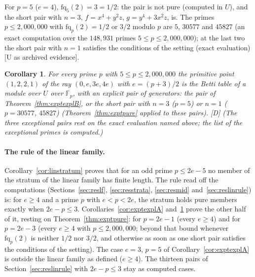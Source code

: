 \documentclass[11pt]{article}
\newtheorem{corollary}{Corollary}
\theoremstyle{definition}
\theoremstyle{remark}
\newcommand{\F}{\mathbb{F}}
\begin{document}
For $p=5$ ($e=4$), $\mathrm{fq}_5(2)=3=1/2$: the pair is not pure (computed in $U$), and the short pair with $n=3$, $f=x^4+y^2z$, $g=y^4+3x^2z$, is. The primes $p\le2{,}000{,}000$ with $\mathrm{fq}_p(2)=1/2$ or $3/2$ modulo $p$ are $5$, $30577$ and $45827$ (an exact computation over the $148{,}931$ primes $5\le p\le2{,}000{,}000$); at the last two the short pair with $n=1$ satisfies the conditions of the setting (exact evaluation) [U as archived evidence].

\begin{corollary}\label{cor:exptexplB}
For every prime $p$ with $5\le p\le2{,}000{,}000$ the primitive point $(1,2,2,1)$ of the ray $(0,e,3e,4e)$ with $e=(p+3)/2$ is the Betti table of a module over $U$ over $\F_p$, with an explicit pair of generators: the pair of Theorem~\ref{thm:exptexplB}, or the short pair with $n=3$ ($p=5$) or $n=1$ ($p=30577$, $45827$) (Theorem~\ref{thm:exptpure} applied to these pairs). [D] (The three exceptional pairs rest on the exact evaluation named above; the list of the exceptional primes is computed.)
\end{corollary}

\paragraph{The rule of the linear family.} Corollary~\ref{cor:linstratum} proves that for an odd prime $p\le2e-5$ no member of the stratum of the linear family has finite length. The rule read off the computations (Sections~\ref{sec:reslf}, \ref{sec:resstrata}, \ref{sec:resmid} and~\ref{sec:reslinrule}) is: for $e\ge4$ and a prime $p$ with $e<p<2e$, the stratum holds pure members exactly when $2e-p\le3$. Corollaries~\ref{cor:exptexplA} and~\ref{cor:exptexplB} prove the other half of it, resting on Theorem~\ref{thm:exptpure}: for $p=2e-1$ (every $e\ge4$) and for $p=2e-3$ (every $e\ge4$ with $p\le2{,}000{,}000$; beyond that bound whenever $\mathrm{fq}_p(2)$ is neither $1/2$ nor $3/2$, and otherwise as soon as one short pair satisfies the conditions of the setting). The case $e=3$, $p=5$ of Corollary~\ref{cor:exptexplA} is outside the linear family as defined ($e\ge4$). The thirteen pairs of Section~\ref{sec:reslinrule} with $2e-p\le3$ stay as computed cases.
\end{document}
